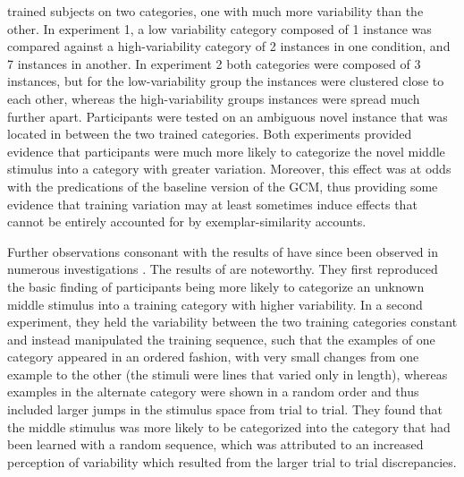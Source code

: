 \documentclass[
  12pt,
  letterpaper,
]{article}
\begin{document}
\textcite{cohenCategoryVariabilityExemplar2001} trained subjects on two
categories, one with much more variability than the other. In experiment
1, a low variability category composed of 1 instance was compared
against a high-variability category of 2 instances in one condition, and
7 instances in another. In experiment 2 both categories were composed of
3 instances, but for the low-variability group the instances were
clustered close to each other, whereas the high-variability groups
instances were spread much further apart. Participants were tested on an
ambiguous novel instance that was located in between the two trained
categories. Both experiments provided evidence that participants were
much more likely to categorize the novel middle stimulus into a category
with greater variation. Moreover, this effect was at odds with the
predications of the baseline version of the GCM, thus providing some
evidence that training variation may at least sometimes induce effects
that cannot be entirely accounted for by exemplar-similarity accounts.

Further observations consonant with the results of
\textcite{cohenCategoryVariabilityExemplar2001} have since been observed
in numerous investigations
\autocite{hahnEffectsCategoryDiversity2005,perlmanFurtherAttemptsClarify2012,sakamotoPuttingPsychologyBack2008,hsuEffectsGenerativeDiscriminative2010}.
The results of \textcite{sakamotoPuttingPsychologyBack2008} are
noteworthy. They first reproduced the basic finding of participants
being more likely to categorize an unknown middle stimulus into a
training category with higher variability. In a second experiment, they
held the variability between the two training categories constant and
instead manipulated the training sequence, such that the examples of one
category appeared in an ordered fashion, with very small changes from
one example to the other (the stimuli were lines that varied only in
length), whereas examples in the alternate category were shown in a
random order and thus included larger jumps in the stimulus space from
trial to trial. They found that the middle stimulus was more likely to
be categorized into the category that had been learned with a random
sequence, which was attributed to an increased perception of variability
which resulted from the larger trial to trial discrepancies.
\end{document}
